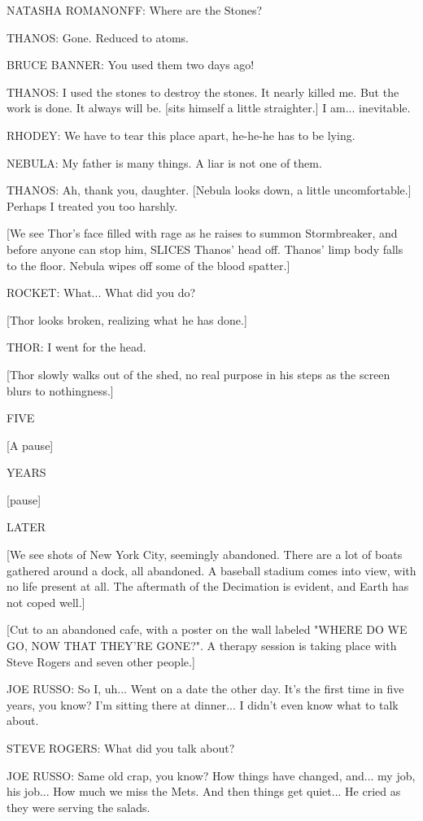 NATASHA ROMANONFF: Where are the Stones?

THANOS: Gone. Reduced to atoms.

BRUCE BANNER: You used them two days ago!

THANOS: I used the stones to destroy the stones. It nearly killed me. But the work is done. It always will be. [sits himself a little straighter.] I am... inevitable.

RHODEY: We have to tear this place apart, he-he-he has to be lying.

NEBULA: My father is many things. A liar is not one of them.

THANOS: Ah, thank you, daughter. [Nebula looks down, a little uncomfortable.] Perhaps I treated you too harshly.

[We see Thor's face filled with rage as he raises to summon Stormbreaker, and before anyone can stop him, SLICES Thanos' head off. Thanos' limp body falls to the floor. Nebula wipes off some of the blood spatter.]

ROCKET: What... What did you do?

[Thor looks broken, realizing what he has done.]

THOR: I went for the head.

[Thor slowly walks out of the shed, no real purpose in his steps as the screen blurs to nothingness.]

FIVE

[A pause]

YEARS

[pause]

LATER

[We see shots of New York City, seemingly abandoned. There are a lot of boats gathered around a dock, all abandoned. A baseball stadium comes into view, with no life present at all. The aftermath of the Decimation is evident, and Earth has not coped well.]

[Cut to an abandoned cafe, with a poster on the wall labeled "WHERE DO WE GO, NOW THAT THEY'RE GONE?". A therapy session is taking place with Steve Rogers and seven other people.]

JOE RUSSO: So I, uh... Went on a date the other day. It's the first time in five years, you know? I'm sitting there at dinner... I didn't even know what to talk about.

STEVE ROGERS: What did you talk about?

JOE RUSSO: Same old crap, you know? How things have changed, and... my job, his job... How much we miss the Mets. And then things get quiet... He cried as they were serving the salads.

